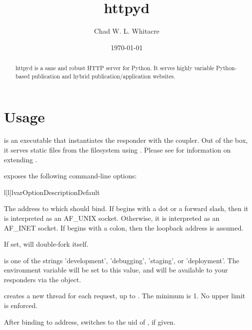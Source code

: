\documentclass{manual}
\title{httpyd}
\author{Chad W. L. Whitacre}
\date\today
\begin{document}
\maketitle

\begin{abstract}

\noindent
httpyd is a sane and robust HTTP server for Python. It serves highly variable
Python-based publication and hybrid publication/application websites.

\end{abstract}

\section{Usage}

 is an executable that instantiates the 
responder with the  coupler. Out of the box, it serves static
files from the filesystem using . Please see  for information on extending .

 exposes the following command-line options:


\begin{tableiii}{l|l|l}{var}{Option}{Description}{Default}

    {The address to which  should bind. If  begins
    with a dot or a forward slash, then it is interpreted as an AF_UNIX socket.
    Otherwise, it is interpreted as an AF_INET socket. If  begins
    with a colon, then the loopback address is assumed.} {}

    {If set,  will double-fork itself.}
    {}

    { is one of the strings 'development', 'debugging', 'staging', or
    'deployment'.  The  environment variable will be set to
    this value, and will be available to your responders via the
     object.} {}

    { creates a new thread for each request, up to .
    The minimum is 1. No upper limit is enforced.}
    {}

    {After binding to address,  switches to the uid of
    , if given.}
    {}

\end{tableiii}
\end{document}
